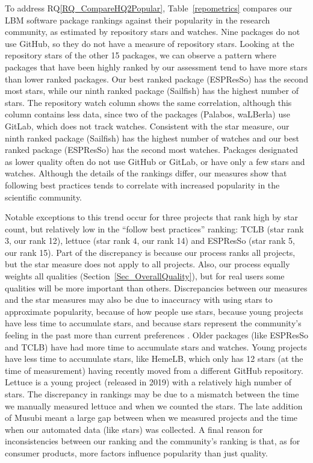 \documentclass[final, 3p, times, authoryear]{elsarticle}
\newcommand{\esp}{ESPResSo\nolinebreak\hspace{-.05em}\raisebox{.4ex}{\small\bf
+}\nolinebreak\hspace{-.10em}\raisebox{.4ex}{\small\bf +}}
\newcommand{\rqref}[1]{RQ\ref{#1}}
\begin{document}
To address \rqref{RQ_CompareHQ2Popular}, Table~\ref{repometrics} compares our
LBM software package rankings against their popularity in the research
community, as estimated by repository stars and watches. Nine packages do not
use GitHub, so they do not have a measure of repository stars. Looking at the
repository stars of the other 15 packages, we can observe a pattern where
packages that have been highly ranked by our assessment tend to have more stars
than lower ranked packages. Our best ranked package (ESPResSo) has the second
most stars, while our ninth ranked package (Sailfish) has the highest number of
stars. The repository watch column shows the same correlation, although
this column contains less data, since two of the packages (Palabos, waLBerla)
use GitLab, which does not track watches. Consistent with the star measure, our
ninth ranked package (Sailfish) has the highest number of watches and our best
ranked package (ESPResSo) has the second most watches. Packages designated as
lower quality often do not use GitHub or GitLab, or have only a few
stars and watches. Although the details of the rankings differ, our measures show
that following best practices tends to correlate with increased popularity in
the scientific community.

Notable exceptions to this trend occur for three projects that rank high by star
count, but relatively low in the ``follow best practices'' ranking: TCLB (star
rank 3, our rank 12), lettuce (star rank 4, our rank 14) and \esp{} (star rank
5, our rank 15).  Part of the discrepancy is because our process ranks all
projects, but the star measure does not apply to all projects.  Also, our
process equally weights all qualities (Section~\ref{Sec_OverallQuality}), but
for real users some qualities will be more important than others. Discrepancies
between our measures and the star measures may also be due to inaccuracy with
using stars to approximate popularity, because of how people use stars, because
young projects have less time to accumulate stars, and because stars represent
the community's feeling in the past more than current preferences
\citep{Szulik2017}. Older packages (like \esp{} and TCLB) have had more time to
accumulate stars and watches. Young projects have less time to accumulate stars,
like HemeLB, which only has 12 stars (at the time of measurement) having
recently moved from a different GitHub repository.  Lettuce is a young project
(released in 2019) with a relatively high number of stars. The discrepancy in
rankings may be due to a mismatch between the time we manually measured lettuce
and when we counted the stars. The late addition of Musubi meant a large gap
between when we measured projects and the time when our automated data (like
stars) was collected. A final reason for inconsistencies between our ranking and
the community's ranking is that, as for consumer products, more factors
influence popularity than just quality.
\end{document}
